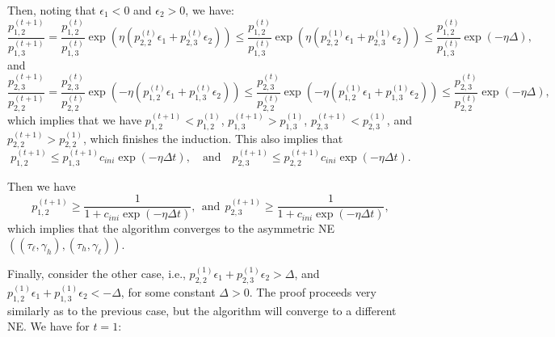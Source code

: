 Then, noting that $\epsilon_1 < 0$ and $\epsilon_2 > 0$, we have:
\[
  \frac{p^{(t+1)}_{1,2}}{p^{(t+1)}_{1,3}} = \frac{p^{(t)}_{1,2}}{p^{(t)}_{1,3}}\exp\left(\eta\left(p^{(t)}_{2,2}\epsilon_1 + p^{(t)}_{2,3}\epsilon_2\right)\right) \leq \frac{p^{(t)}_{1,2}}{p^{(t)}_{1,3}}\exp\left(\eta\left(p^{(1)}_{2,2}\epsilon_1 + p^{(1)}_{2,3}\epsilon_2\right)\right)\leq \frac{p^{(t)}_{1,2}}{p^{(t)}_{1,3}}\exp(-\eta \Delta),
\]
and 
\[
  \frac{p^{(t+1)}_{2,3}}{p^{(t+1)}_{2,2}} = \frac{p^{(t)}_{2,3}}{p^{(t)}_{2,2}}\exp\left(-\eta\left(p^{(t)}_{1,2}\epsilon_1 + p^{(t)}_{1,3}\epsilon_2\right)\right) \leq \frac{p^{(t)}_{2,3}}{p^{(t)}_{2,2}}\exp\left(-\eta\left(p^{(1)}_{1,2}\epsilon_1 + p^{(1)}_{1,3}\epsilon_2\right)\right)\leq \frac{p^{(t)}_{2,3}}{p^{(t)}_{2,2}}\exp(-\eta \Delta),
\]
which implies that we have $p^{(t+1)}_{1,2}< p^{(1)}_{1,2}$,  $p^{(t+1)}_{1,3}> p^{(1)}_{1,3}$, $p^{(t+1)}_{2,3}<p^{(1)}_{2,3}$, and $p^{(t+1)}_{2,2}>p^{(1)}_{2,2}$, which finishes the induction. This also implies that 
\[
p^{(t+1)}_{1,2}\leq p^{(t+1)}_{1,3}c_{ini}\exp(-\eta  \Delta t), \quad \text{and} \quad p^{(t+1)}_{2,3}\leq p^{(t+1)}_{2,2}c_{ini}\exp(-\eta  \Delta t).
\]





Then we have 
\[
p^{(t+1)}_{1,2}\geq \frac{1}{1+c_{ini}\exp\left(-\eta\Delta t\right)},\ \ \text{and}\ \ p^{(t+1)}_{2,3}\geq \frac{1}{1+c_{ini}\exp\left(-\eta\Delta t\right)},
\]
which implies that the algorithm converges to the asymmetric NE $((\tau_{\ell},\gamma_{h}),(\tau_{h},\gamma_{\ell}))$. 

Finally, consider the other case, i.e., $p^{(1)}_{2,2}\epsilon_1+p^{(1)}_{2,3}\epsilon_2>\Delta$, and $p^{(1)}_{1,2}\epsilon_1+p^{(1)}_{1,3}\epsilon_2<-\Delta$, for some constant $\Delta>0$. The proof proceeds very similarly as to the previous case, but the algorithm will converge to a different NE. We have for $t=1$: 

